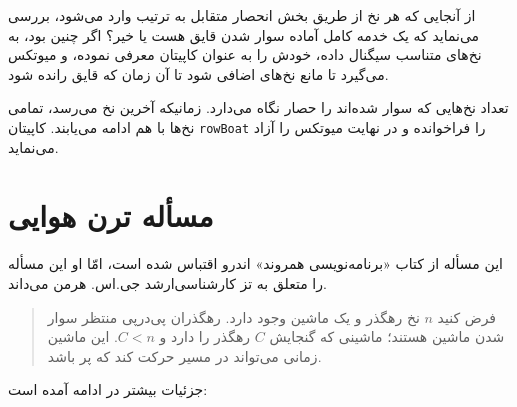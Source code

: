 \documentclass{book}
\newcommand{\clearemptydoublepage}{\newpage\cleardoublepage}
\begin{document}
    از آنجایی که هر نخ از طریق بخش انحصار متقابل به ترتیب وارد می‌شود، 
    بررسی می‌نماید که یک خدمه کامل آماده سوار شدن قایق هست یا خیر؟ اگر چنین بود، به نخ‌های متناسب سیگنال داده، خودش را به عنوان کاپیتان 
    معرفی نموده، و میوتکس می‌گیرد تا مانع نخ‌های اضافی شود تا آن زمان که قایق رانده شود. 

    تعداد نخ‌هایی که سوار شده‌اند را حصار نگاه می‌دارد. زمانیکه آخرین نخ می‌رسد، تمامی نخ‌ها با هم ادامه می‌یابند. 
    کاپیتان  {\tt rowBoat} را فراخوانده و در نهایت میوتکس را آزاد می‌نماید. 
    


\clearemptydoublepage
\section{مسأله ترن هوایی}

    این مسأله از کتاب «برنامه‌نویسی همروند» اندرو اقتباس شده است، 
    امّا او این مسأله را متعلق به تز کارشناسی‌ارشد جی.‌اس. هرمن می‌داند. 

\begin {quotation}
    فرض کنید $n$ نخ رهگذر و یک ماشین وجود دارد. رهگذران پی‌درپی منتظر سوار شدن ماشین هستند؛ ماشینی که گنجایش $C$  رهگذر را دارد و $C<n$. 
    این ماشین زمانی می‌تواند در مسیر حرکت کند که پر باشد. 
\end{quotation}

    جزئیات بیشتر در ادامه آمده است:
\end{document}

